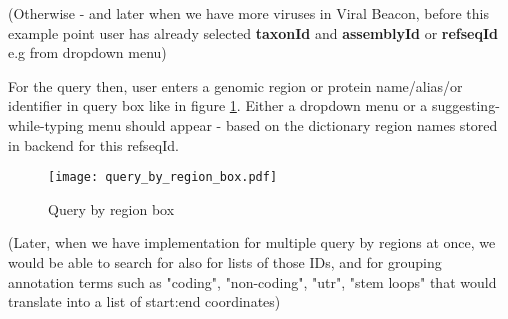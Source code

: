 \documentclass[a4paper, 10pt]{article}        %
\begin{document}
(Otherwise - and later when we have more viruses in Viral Beacon, before this example point user has already selected \textbf{taxonId} and \textbf{assemblyId} or \textbf{refseqId} e.g from dropdown menu)

For the query then, user enters a genomic region or protein name/alias/or identifier in query box like in figure \ref{fig:querybox}. Either a dropdown menu or a suggesting-while-typing menu should appear - based on the dictionary region names stored in backend for this refseqId.
 
     \begin{figure}[h!]
     \centering
    \texttt{[image: query\_by\_region\_box.pdf]}
     \caption{Query by region box}
     \label{fig:querybox}
     \end{figure}
     
(Later, when we have implementation for multiple query by regions at once, we would be able to search for also for lists of those IDs, and for grouping annotation terms such as "coding", "non-coding", "utr", "stem loops" that would translate into a list of start:end coordinates)


\end{document}
